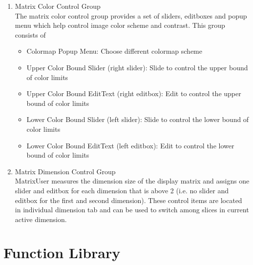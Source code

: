 \documentclass{article}%
\begin{document}
\begin{enumerate}
	\item Matrix Color Control Group \\
	
	The matrix color control group provides a set of sliders, editboxes and popup menu which help control image color scheme and contrast. This group consists of
	
	\begin{itemize}
		\item Colormap Popup Menu: Choose different colormap scheme
		\item Upper Color Bound Slider (right slider): Slide to control the upper bound of color limits
		\item Upper Color Bound EditText (right editbox): Edit to control the upper bound of color limits
		\item Lower Color Bound Slider (left slider): Slide to control the lower bound of color limits
		\item Lower Color Bound EditText (left editbox): Edit to control the lower bound of color limits
	\end{itemize}
	
	\item Matrix Dimension Control Group \\
	
	MatrixUser measures the dimension size of the display matrix and assigns one slider and editbox for each dimension that is above 2 (i.e. no slider and editbox for the first and second dimension). These control items are located in individual dimension tab and can be used to switch among slices in current active dimension.
	
	\end{enumerate}
	
\section{Function Library}
	
\end{document}
